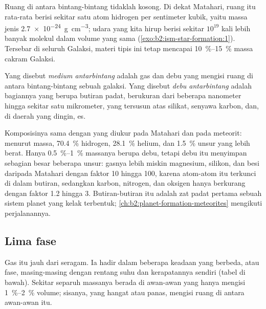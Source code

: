 Ruang di antara bintang-bintang tidaklah kosong. Di dekat Matahari, ruang itu
rata-rata berisi sekitar satu atom hidrogen per sentimeter kubik, yaitu massa jenis
\qty{2.7e-24}{g.cm^{-3}}; udara yang kita hirup berisi sekitar $10^{19}$ kali lebih
banyak molekul dalam volume yang sama (\cref{exo:b2:ism-star-formation:1}). Tersebar di seluruh Galaksi, materi tipis
ini tetap mencapai \qtyrange{10}{15}{\percent} massa
cakram Galaksi.

\begin{definition}
\label{def:b2:ism-star-formation:ism}
Yang disebut \emph{medium antarbintang} adalah gas dan debu
yang mengisi ruang di antara bintang-bintang sebuah galaksi. Yang disebut \emph{debu
antarbintang} adalah bagiannya yang berupa butiran padat,
berukuran dari beberapa nanometer hingga sekitar satu mikrometer, yang tersusun atas
silikat, senyawa karbon, dan, di daerah yang dingin, es.
\end{definition}

Komposisinya sama dengan yang diukur pada Matahari dan pada meteorit: menurut massa,
\qty{70.4}{\percent} hidrogen, \qty{28.1}{\percent} helium, dan
\qty{1.5}{\percent} unsur yang lebih berat. Hanya \qtyrange{0.5}{1}{\percent}
massanya berupa debu, tetapi debu itu menyimpan sebagian besar beberapa unsur: gasnya
lebih miskin magnesium, silikon, dan besi daripada Matahari dengan faktor 10 hingga 100,
karena atom-atom itu terkunci di dalam butiran, sedangkan karbon, nitrogen, dan oksigen
hanya berkurang dengan faktor 1.2 hingga 3. Butiran-butiran itu adalah zat padat pertama
sebuah sistem planet yang kelak terbentuk; \cref{ch:b2:planet-formation-meteorites}
mengikuti perjalanannya.

\subsection{Lima fase}

Gas itu jauh dari seragam. Ia hadir dalam beberapa keadaan yang berbeda, atau fase,
masing-masing dengan rentang suhu dan kerapatannya sendiri (tabel di bawah). Sekitar
separuh massanya berada di awan-awan yang hanya mengisi \qtyrange{1}{2}{\percent} volume;
sisanya, yang hangat atau panas, mengisi ruang di antara awan-awan itu.


